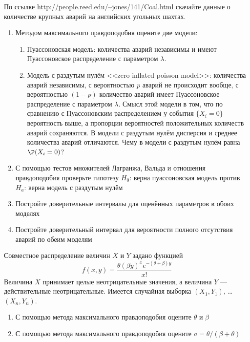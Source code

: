 \documentclass[pdftex,11pt,openany]{book}\usepackage[]{graphicx}\usepackage[]{color}
\begin{document}
\begin{problem}
\useR По ссылке \url{http://people.reed.edu/~jones/141/Coal.html} скачайте данные о количестве крупных аварий на английских угольных шахтах.
\begin{enumerate}
\item Методом максимального правдоподобия оцените две модели:
\begin{enumerate}
\item Пуассоновская модель: количества аварий независимы и имеют Пуассоновское распределение с параметром $\lambda$.
\item Модель с раздутым нулём  <<zero inflated poisson model>>: количества аварий независимы, с вероятностью $p$ аварий не происходит вообще, с вероятностью $(1-p)$ количество аварий имеет Пуассоновское распределение с параметром $\lambda$. Смысл этой модели в том, что по сравнению с Пуассоновским распределением у события $\{X_i=0\}$ вероятность выше, а пропорции вероятностей положительных количеств аварий сохраняются. В модели с раздутым нулём дисперсия и среднее количества аварий отличаются. Чему в модели с раздутым нулём равна $\P(X_i=0)$?
\end{enumerate}
\item С помощью тестов множителей Лагранжа, Вальда и отношения правдоподобия проверьте гипотезу $H_0$: верна пуассоновская модель против $H_{a}$: верна модель с раздутым нулём
\item Постройте доверительные интервалы для оценённых параметров в обоих моделях
\item Постройте доверительный интервал для вероятности полного отсутствия аварий по обеим моделям
\end{enumerate}
\end{problem}

\begin{solution}
\end{solution}


\begin{problem}
Совместное распределение величин $X$ и $Y$ задано функцией
\[
f(x,y)=\frac{\theta(\beta y)^x e^{-(\theta+\beta)y}}{x!}
\]
Величина $X$ принимает целые неотрицательные значения, а величина $Y$ --- действительные неотрицательные. Имеется случайная выборка $(X_1,Y_1)$, \ldots $(X_n,Y_n)$.
\begin{enumerate}
\item С помощью метода максимального правдоподобия оцените $\theta$ и $\beta$
\item С помощью метода максимального правдоподобия оцените $a=\theta/(\beta+\theta)$
\end{enumerate}
\end{problem}
\end{document}
